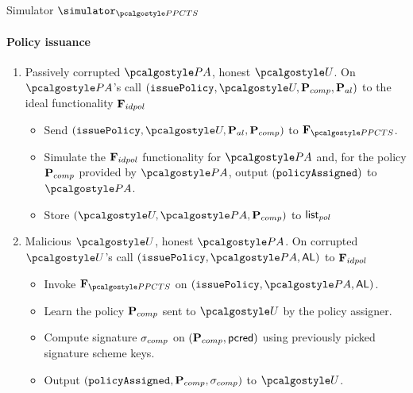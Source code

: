 \documentclass[runningheads,10pt]{llncs}
\numberwithin{equation}{section}
\begin{document}
\begin{simbox}{Simulator $\simulator_{\PPCTS}$}
  \paragraph{Policy issuance}
  \begin{enumerate}
  \item Passively corrupted $\polas$, honest $\user$.  On $\polas$'s call $(\issuePolicy, \user, \comppolicy, \alpolicy)$
      to the ideal functionality $\mathbf{F}_{{idpol}}$ %
    \begin{itemize}
    \item Send $(\issuePolicy, \user, \alpolicy, \comppolicy)$ to $\func{\PPCTS}$.
    \item Simulate the $\mathbf{F}_{{idpol}}$ functionality for $\polas$ and, for the policy
      $\mathbf{P}_{comp}$ provided by $\polas$, output $(\mathtt{policyAssigned})$ to $\polas$.
    \item Store $(\user, \polas, \comppolicy)$ to ${\mathsf{list}_{pol}}$
    \end{itemize}
  \item Malicious $\user$, honest $\polas$. On corrupted $\user$'s call $(\issuePolicy, \polas, \AL)$ to
      $\mathbf{F}_{{idpol}}$
    \begin{itemize}
    \item Invoke $\func{\PPCTS}$ on $(\issuePolicy, \polas, \AL)$.
    \item Learn the policy $\mathbf{P}_{comp}$ sent to $\user$ by the policy assigner.
    \item Compute signature $\sigma_{comp}$ on $(\mathbf{P}_{comp}, \mathsf{pcred})$ using
      previously picked signature scheme keys.
    \item Output $(\mathtt{policyAssigned}, \mathbf{P}_{comp}, \sigma_{comp})$ to $\user$.
    \end{itemize}
  \end{enumerate}


\end{simbox}
\end{document}
